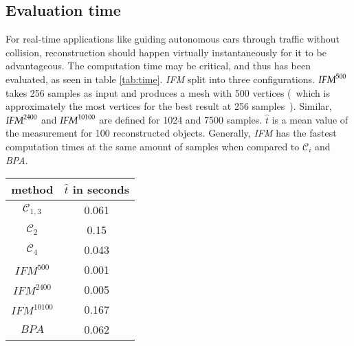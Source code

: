 \subsection{Evaluation time}
For real-time applications like guiding autonomous cars through traffic without collision,
 reconstruction should happen virtually instantaneously for it to be advantageous. 
 The computation time may be critical, and thus has been evaluated, as seen in table
  \ref{tab:time}. 
\emph{IFM} split into three configurations. $\emph{IFM}^{500}$ takes 256 samples as input 
and produces a mesh with 500 vertices (~which is approximately the most vertices for the best
 result at 256 samples~). Similar, $\emph{IFM}^{2400}$ and $\emph{IFM}^{10100}$ are defined 
 for 1024 and 7500 samples.
$\hat{t}$ is a mean value of the measurement for 100 reconstructed objects. 
Generally, \emph{IFM} has the fastest computation times at the same amount of samples when compared to $\mathcal{C}_i$ and \emph{BPA}.
\begin{center}
     \label{tab:time} 
        \begin{tabular}{| c | c |}
            \hline
            method & $\hat{t}$ in seconds \\\hline
            $\mathcal{C}_{1,3}$ & 0.061 \\\hline
             $\mathcal{C}_2$ & 0.15 \\\hline
             $\mathcal{C}_4$ & 0.043 \\\hline
             $IFM^{500}$ & 0.001 \\\hline
             $IFM^{2400}$ & 0.005 \\\hline
             $IFM^{10100}$ & 0.167 \\\hline
             $BPA$ & 0.062 \\\hline
        \end{tabular}
\end{center}

